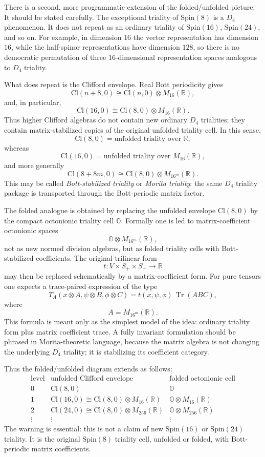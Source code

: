\documentclass[11pt]{article}
\newcommand{\Cl}{\mathrm{Cl}}
\begin{document}
There is a second, more programmatic extension of the folded/unfolded picture.
It should be stated carefully. The exceptional triality of $\mathrm{Spin}(8)$
is a $D_4$ phenomenon. It does not repeat as an ordinary triality of
$\mathrm{Spin}(16)$, $\mathrm{Spin}(24)$, and so on. For example, in dimension
$16$ the vector representation has dimension $16$, while the half-spinor
representations have dimension $128$, so there is no democratic permutation of
three $16$-dimensional representation spaces analogous to $D_4$ triality.

What does repeat is the Clifford envelope. Real Bott periodicity gives
\[
\Cl(n+8,0)\cong \Cl(n,0)\otimes M_{16}(\mathbb R),
\]
and, in particular,
\[
\Cl(16,0)\cong \Cl(8,0)\otimes M_{16}(\mathbb R).
\]
Thus higher Clifford algebras do not contain new ordinary $D_4$ trialities;
they contain matrix-stabilized copies of the original unfolded triality cell.
In this sense,
\[
\Cl(8,0)=\text{unfolded triality over }\mathbb R,
\]
whereas
\[
\Cl(16,0)=\text{unfolded triality over }M_{16}(\mathbb R),
\]
and more generally
\[
\Cl(8+8m,0)
\cong
\Cl(8,0)\otimes M_{16^m}(\mathbb R).
\]
This may be called \emph{Bott-stabilized triality} or \emph{Morita triality}:
the same $D_4$ triality package is transported through the Bott-periodic matrix
factor.

The folded analogue is obtained by replacing the unfolded envelope
$\Cl(8,0)$ by the compact octonionic triality cell $\mathbb O$. Formally one
is led to matrix-coefficient octonionic spaces
\[
\mathbb O\otimes M_{16^m}(\mathbb R),
\]
not as new normed division algebras, but as folded triality cells with
Bott-stabilized coefficients. The original trilinear form
\[
t:V\times S_+\times S_-\to\mathbb R
\]
may then be replaced schematically by a matrix-coefficient form. For pure
tensors one expects a trace-paired expression of the type
\[
T_A(x\otimes A,\psi\otimes B,\phi\otimes C)
=
 t(x,\psi,\phi)\,\operatorname{Tr}(ABC),
\]
where
\[
A=M_{16^m}(\mathbb R).
\]
This formula is meant only as the simplest model of the idea: ordinary
triality form plus matrix coefficient trace. A fully invariant formulation
should be phrased in Morita-theoretic language, because the matrix algebra is
not changing the underlying $D_4$ triality; it is stabilizing its coefficient
category.

Thus the folded/unfolded diagram extends as follows:
\[
\begin{array}{c|c|c}
\text{level} & \text{unfolded Clifford envelope} & \text{folded octonionic cell}\\
\hline
0 & \Cl(8,0) & \mathbb O\\
1 & \Cl(16,0)\cong \Cl(8,0)\otimes M_{16}(\mathbb R) & \mathbb O\otimes M_{16}(\mathbb R)\\
2 & \Cl(24,0)\cong \Cl(8,0)\otimes M_{256}(\mathbb R) & \mathbb O\otimes M_{256}(\mathbb R)\\
\vdots & \vdots & \vdots
\end{array}
\]
The warning is essential: this is not a claim of new $\mathrm{Spin}(16)$ or
$\mathrm{Spin}(24)$ triality. It is the original $\mathrm{Spin}(8)$ triality
cell, unfolded or folded, with Bott-periodic matrix coefficients.
\end{document}
